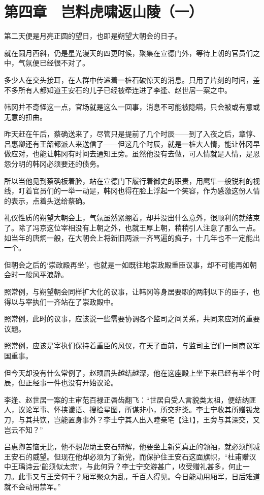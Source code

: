 \section{第四章　岂料虎啸返山陵（一）}

第二天便是月亮正圆的望日，也即是朔望大朝会的日子。

就在圆月西斜，仍是星光漫天的四更时候，聚集在宣德门外，等待上朝的官员们之中，气氛便已经很不对了。

多少人在交头接耳，在人群中传递着一桩石破惊天的消息。只用了片刻的时间，差不多所有人都知道王安石的儿子已经被牵连进了李逢、赵世居一案之中。

韩冈并不奇怪这一点，官场就是这么一回事，消息不可能被隐瞒，只会被或有意或无意的扭曲。

昨天赶在午后，蔡确送来了，尽管只是提前了几个时辰——到了入夜之后，章惇、吕惠卿还有王韶都派人来送信了——但这几个时辰，就是一桩大人情，能让韩冈早做应对，也能让韩冈有时间去通知王旁。虽然他没有去做，可人情就是人情，是恩怨分明的韩冈必须要还的债务。

所以当他见到蔡确板着脸，站在宣德门下履行着御史的职责，用鹰隼一般锐利的视线，盯着官员们的一举一动是，韩冈也得在脸上浮起一个笑容，作为感激这份人情的表示，点着头送给蔡确。

礼仪性质的朔望大朝会上，气氛虽然紧绷着，却并没出什么意外，很顺利的就结束了。除了冯京这位宰相没有上朝之外，也就王厚上朝，稍稍引人注意了那么一点。如当年的唐炯一般，在大朝会上将新旧两派一齐骂遍的疯子，十几年也不一定能出一个。

但朝会之后的‘崇政殿再坐’，也就是一如既往地崇政殿重臣议事，却不可能再如朝会时一般风平浪静。

照常例，与朔望朝会同样扩大化的议事，让韩冈等身居要职的两制以下的臣子，也得以与宰执们一齐站在了崇政殿中。

照常例，此时的议事，应该说一些需要协调各个监司之间关系，共同来应对的重要议题。

照常例，应该是宰执们保持着重臣的风仪，在天子面前，与监司主官们一同商议军国重事。

但今天却没有什么常例了，赵顼眉头越结越深，他在这座殿上坐下来已经有半个时辰，但正经事一件也没有开始议论。

李逢、赵世居一案的主审范百禄正唇齿翻飞：“世居自受人言貌类太祖，便结纳匪人，议论军事、怀挟谶语、搜检星图，所谋非小，所交非类。李士宁收其所赠钑龙刀，与其共饮，岂能置身事外？李士宁其人出入睦亲宅【注1】，王旁与其深交，又岂云不知？”

吕惠卿苦恼无比，他不想帮助王安石辩解，他要坐上新党真正的领袖，就必须削减王安石的威望。但现在他却必须为了新党，而保护住王安石这面旗帜，“杜甫赠汉中王瑀诗云‘齨须似太宗’，与此何异？李士宁交游甚广，收受赠礼甚多，何止一刀。此事又与王旁何干？厢军聚众为乱，千百人得见。今日能动用厢军，日后难道就不会动用禁军。”

